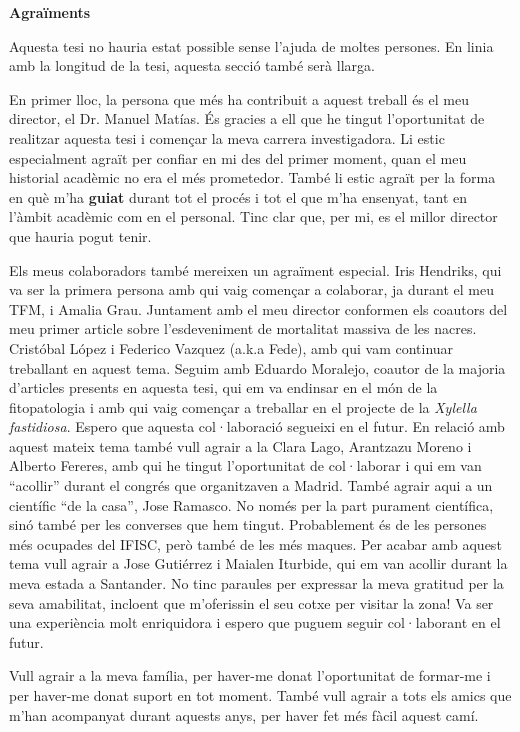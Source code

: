 \pagebreak
\thispagestyle{empty}

\begin{center}
    \textbf{\Large Agraïments}
\end{center}

Aquesta tesi no hauria estat possible sense l'ajuda de moltes persones. En
linia amb la longitud de la tesi, aquesta secció també serà llarga.

En primer lloc, la persona que més ha contribuit a aquest treball és el meu
director, el Dr. Manuel Matías. És gracies a ell que he tingut l'oportunitat de
realitzar aquesta tesi i començar la meva carrera investigadora. Li estic
especialment agraït per confiar en mi des del primer moment, quan el meu
historial acadèmic no era el més prometedor. També li estic agraït per la forma
en què m'ha \textbf{guiat} durant tot el procés i tot el que m'ha ensenyat,
tant en l'àmbit acadèmic com en el personal. Tinc clar que, per mi, es el
millor director que hauria pogut tenir.

Els meus colaboradors també mereixen un agraïment especial. Iris Hendriks, qui
va ser la primera persona amb qui vaig començar a colaborar, ja durant el meu
TFM, i Amalia Grau. Juntament amb el meu director conformen els coautors del
meu primer article sobre l'esdeveniment de mortalitat massiva de les nacres.
Cristóbal López i Federico Vazquez (a.k.a Fede), amb qui vam continuar
treballant en aquest tema. Seguim amb Eduardo Moralejo, coautor de la majoria
d'articles presents en aquesta tesi, qui em va endinsar en el món de la
fitopatologia i amb qui vaig començar a treballar en el projecte de la
\textit{Xylella fastidiosa}. Espero que aquesta col·laboració segueixi en el
futur. En relació amb aquest mateix tema també vull agrair a la Clara Lago,
Arantzazu Moreno i Alberto Fereres, amb qui he tingut l'oportunitat de
col·laborar i qui em van ``acollir'' durant el congrés que organitzaven a
Madrid. També agrair aqui a un científic ``de la casa'', Jose Ramasco. No només
per la part purament científica, sinó també per les converses que hem tingut.
Probablement és de les persones més ocupades del IFISC, però també de les més
maques. Per acabar amb aquest tema vull agrair a Jose Gutiérrez i Maialen
Iturbide, qui em van acollir durant la meva estada a Santander. No tinc
paraules per expressar la meva gratitud per la seva amabilitat, incloent
que m'oferissin el seu cotxe per visitar la zona! Va ser una experiència molt
enriquidora i espero que puguem seguir col·laborant en el futur.

Vull agrair a la meva família, per haver-me donat l'oportunitat de
formar-me i per haver-me donat suport en tot moment. També vull agrair a tots
els amics que m'han acompanyat durant aquests anys, per haver fet més fàcil
aquest camí.


\vfill
